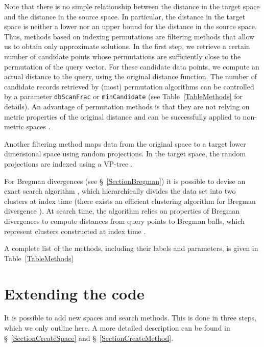 \documentclass[runningheads,a4paper]{llncs}
\newcommand{\todonoteinline}[1]{\todo[color=red!40,inline,caption={TODO}]{#1}}
\newcommand{\ttt}[1]{\texttt{#1}}
\begin{document}
{Note that there is no simple relationship between the distance in the target space
and the distance in the source space. In particular, the distance in the target space is neither a lower nor an upper bound
for the distance in the source space.
Thus, methods based on indexing permutations are filtering methods that allow us to obtain only approximate solutions.
In the first step, we retrieve a certain number of candidate points whose permutations are sufficiently close
to the permutation of the query vector.
For these candidate data points, we compute an actual distance to the query, using the original distance function.
The number of candidate records retrieved by (most) permutation algorithms can be controlled by a parameter \ttt{dbScanFrac} or \ttt{minCandidate} (see Table~\ref{TableMethods} for details).
An advantage of permutation methods is that they are not relying on metric properties of the original distance 
and can be successfully applied to non-metric spaces \cite{Boytsov_and_Bilegsaikhan:nips2013}.

Another filtering method maps data from the original space to a target lower dimensional space
using random projections. In the target space, the random projections are indexed using
a VP-tree \cite{Uhlmann:1991,Yianilos:1993}.

For Bregman divergences (see \S~\ref{SectionBregman}) it is possible to devise
an exact search algorithm \cite{Cayton:2008},
which hierarchically divides the data set into two clusters  
at index time (there exists an efficient clustering algorithm for Bregman divergence \cite{banerjee2005clustering}).
At search time,
the algorithm relies on properties of Bregman divergences to compute distances from query points to Bregman balls,
which represent clusters constructed at index time \cite{Cayton:2008}.

A complete list of the methods, including their labels and parameters, is given in Table~\ref{TableMethods}

\section{Extending the code}\label{SectionExtend}
It is possible to add new spaces and search methods.
This is done in three steps, which we only outline here.
A more detailed description can be found in \S~\ref{SectionCreateSpace}
and \S~\ref{SectionCreateMethod}.

\todonoteinline{Important for VS you need to use angle brackets!!!}

}
\end{document}
